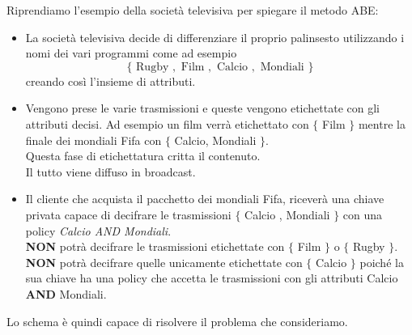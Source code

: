 \vspace{0.4cm}

Riprendiamo l'esempio della società televisiva per spiegare il metodo ABE:\\
\begin{itemize}
	\item La società televisiva decide di differenziare il proprio palinsesto utilizzando i nomi dei vari programmi come ad esempio
	\[ \{ \text{ Rugby } , \text{ Film } , \text{ Calcio } , \text{ Mondiali }\} \]
	creando così l'insieme di attributi.
	\item Vengono prese le varie trasmissioni e queste vengono etichettate con gli attributi decisi. Ad esempio un film verrà etichettato con $\{$ Film $\}$ mentre la finale dei mondiali Fifa con $\{$ Calcio, Mondiali $\}$.\\
	Questa fase di etichettatura critta il contenuto.\\
	Il tutto viene diffuso in broadcast.
	\item Il cliente che acquista il pacchetto dei mondiali Fifa, riceverà una chiave privata capace di decifrare le trasmissioni $\{ $ Calcio , Mondiali $ \}$ con una policy \emph{Calcio AND Mondiali}.\\
	\textbf{NON} potrà decifrare le trasmissioni etichettate con $\{$ Film $\}$ o $\{$ Rugby $\}$. \textbf{NON} potrà decifrare quelle unicamente etichettate con $\{$ Calcio $\}$ poiché la sua chiave ha una policy che accetta le trasmissioni con gli attributi Calcio \textbf{AND} Mondiali.
\end{itemize}

\vspace{0.2cm}
Lo schema è quindi capace di risolvere il problema che consideriamo.\\[1cm]

